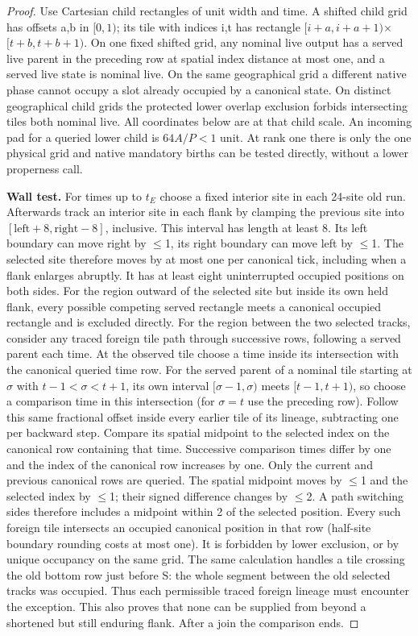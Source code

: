 \begin{proof}
Use Cartesian child rectangles of unit width and time. A shifted child grid has offsets a,b in \([0,1)\); its tile with indices i,t has rectangle \([i+a,i+a+1)\)\(\times\)\([t+b,t+b+1)\). On one fixed shifted grid, any nominal live output has a served live parent in the preceding row at spatial index distance at most one, and a served live state is nominal live. On the same geographical grid a different native phase cannot occupy a slot already occupied by a canonical state. On distinct geographical child grids the protected lower overlap exclusion forbids intersecting tiles both nominal live. All coordinates below are at that child scale. An incoming pad for a queried lower child is \(64A/P<1\) unit. At rank one there is only the one physical grid and native mandatory births can be tested directly, without a lower properness call.



\textbf{Wall test.} For times up to \(t_E\) choose a fixed interior site in each 24-site old run. Afterwards track an interior site in each flank by clamping the previous site into \([\mathrm{left}+8,\mathrm{right}- 8]\), inclusive. This interval has length at least 8. Its left boundary can move right by \(\le\)1, its right boundary can move left by \(\le\)1. The selected site therefore moves by at most one per canonical tick, including when a flank enlarges abruptly. It has at least eight uninterrupted occupied positions on both sides. For the region outward of the selected site but inside its own held flank, every possible competing served rectangle meets a canonical occupied rectangle and is excluded directly. For the region between the two selected tracks, consider any traced foreign tile path through successive rows, following a served parent each time. At the observed tile choose a time inside its intersection with the canonical queried time row. For the served parent of a nominal tile starting at \(\sigma\) with \(t- 1<\sigma <t+1\), its own interval \([\sigma - 1,\sigma )\) meets \([t- 1,t+1)\), so choose a comparison time in this intersection (for \(\sigma =t\) use the preceding row). Follow this same fractional offset inside every earlier tile of its lineage, subtracting one per backward step. Compare its spatial midpoint to the selected index on the canonical row containing that time. Successive comparison times differ by one and the index of the canonical row increases by one. Only the current and previous canonical rows are queried. The spatial midpoint moves by \(\le\)1 and the selected index by \(\le\)1; their signed difference changes by \(\le\)2. A path switching sides therefore includes a midpoint within 2 of the selected position. Every such foreign tile intersects an occupied canonical position in that row (half-site boundary rounding costs at most one). It is forbidden by lower exclusion, or by unique occupancy on the same grid. The same calculation handles a tile crossing the old bottom row just before S: the whole segment between the old selected tracks was occupied. Thus each permissible traced foreign lineage must encounter the exception. This also proves that none can be supplied from beyond a shortened but still enduring flank. After a join the comparison ends.


\end{proof}
